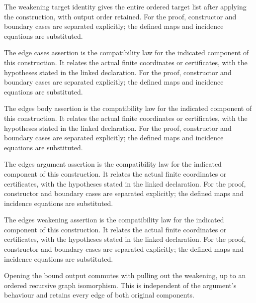 The weakening target identity gives the entire ordered target list after applying the construction, with output order retained.
For the proof, constructor and boundary cases are separated explicitly; the defined maps and incidence equations are substituted.
\par{}

The edge cases assertion is the compatibility law for the indicated component of this construction. It relates the actual finite coordinates or certificates, with the hypotheses stated in the linked declaration.
For the proof, constructor and boundary cases are separated explicitly; the defined maps and incidence equations are substituted.
\par{}

The edges body assertion is the compatibility law for the indicated component of this construction. It relates the actual finite coordinates or certificates, with the hypotheses stated in the linked declaration.
For the proof, constructor and boundary cases are separated explicitly; the defined maps and incidence equations are substituted.
\par{}

The edges argument assertion is the compatibility law for the indicated component of this construction. It relates the actual finite coordinates or certificates, with the hypotheses stated in the linked declaration.
For the proof, constructor and boundary cases are separated explicitly; the defined maps and incidence equations are substituted.
\par{}

The edges weakening assertion is the compatibility law for the indicated component of this construction. It relates the actual finite coordinates or certificates, with the hypotheses stated in the linked declaration.
For the proof, constructor and boundary cases are separated explicitly; the defined maps and incidence equations are substituted.
\par{}

Opening the bound output commutes with pulling out the weakening, up to an ordered recursive graph isomorphism. This is independent of the argument's behaviour and retains every edge of both original components.
\par{}

